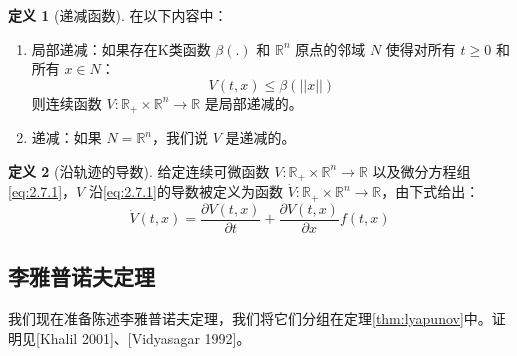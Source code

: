 \documentclass[UTF8,12pt,a4paper]{ctexart}
\theoremstyle{definition}
\newtheorem{definition}{定义}[section]
\begin{document}
\begin{definition}[递减函数]
在以下内容中：
\begin{enumerate}
\item 局部递减：如果存在K类函数 $\beta(.)$ 和 $\mathbb{R}^n$ 原点的邻域 $N$ 使得对所有 $t \geq 0$ 和所有 $x \in N$：
\[
V(t, x) \leq \beta(||x||)
\]
则连续函数 $V: \mathbb{R}_+ \times \mathbb{R}^n \rightarrow \mathbb{R}$ 是局部递减的。

\item 递减：如果 $N=\mathbb{R}^n$，我们说 $V$ 是递减的。
\end{enumerate}
\end{definition}

\begin{definition}[沿轨迹的导数]
给定连续可微函数 $V: \mathbb{R}_+ \times \mathbb{R}^n \rightarrow \mathbb{R}$ 以及微分方程组\eqref{eq:2.7.1}，$V$ 沿\eqref{eq:2.7.1}的导数被定义为函数 $\dot{V}: \mathbb{R}_+ \times \mathbb{R}^n \rightarrow \mathbb{R}$，由下式给出：
\[
\dot{V}(t, x) = \frac{\partial V(t, x)}{\partial t} + \frac{\partial V(t, x)}{\partial x} f(t, x)
\]
\end{definition}

\subsection{李雅普诺夫定理}

我们现在准备陈述李雅普诺夫定理，我们将它们分组在定理\ref{thm:lyapunov}中。证明见[Khalil 2001]、[Vidyasagar 1992]。
\end{document}
